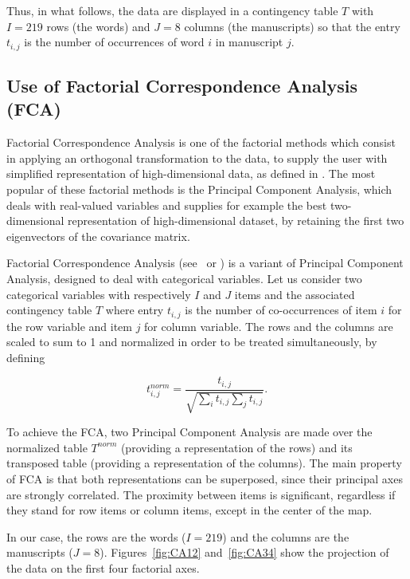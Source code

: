 \documentclass[preprint]{elsarticle}
\begin{document}
Thus, in what follows, the data are displayed in a contingency table $T$ with $I=219$ rows (the words) and $J=8$ columns (the manuscripts) so that the entry $t_{i,j}$ is the number of occurrences of word $i$ in manuscript $j$.

\subsection{Use of Factorial Correspondence Analysis (FCA)}\label{fcadef}

Factorial Correspondence Analysis is one of the factorial methods which consist in applying an orthogonal transformation to the data, to supply the user with simplified representation of high-dimensional data, as defined in 
\cite {Morrison1967}. The most popular of these factorial methods is the Principal Component Analysis, which deals with real-valued variables and supplies for example the best two-dimensional representation of high-dimensional dataset, by retaining the first two eigenvectors of the covariance matrix. 

Factorial Correspondence Analysis (see~\cite {Benzecri1992} or \cite {Lebart1984}) is a variant of Principal Component Analysis, designed to deal with categorical variables. Let us consider two categorical variables with respectively $I$ and $J$ items  and the associated contingency table $T$ where entry $t_{i,j}$ is the number of co-occurrences of item $i$ for the row variable and item $j$ for column variable. The rows and the columns are scaled to sum to 1 and normalized in order to be treated simultaneously, by defining

\begin{equation}
t_{i,j}^{norm}=\frac{t_{i,j}}{\sqrt{\sum_i t_{i,j} \sum_j t_{i,j}}}.\label{normalization}
\end{equation}

To achieve the FCA, two Principal Component Analysis are made over the normalized table $T^{norm}$ (providing a representation of the rows) and its transposed table (providing a representation of the columns). The main property of FCA is that  both representations can be superposed, since their principal axes are strongly correlated. The proximity between items is significant, regardless if they stand for  row items or column items, except in the center of the map.

In our case, the rows are the words ($I=219$) and the columns are the manuscripts ($J=8$). Figures~\ref{fig:CA12} and~\ref{fig:CA34} show the projection of the data on the first four factorial axes. 
\end{document}
